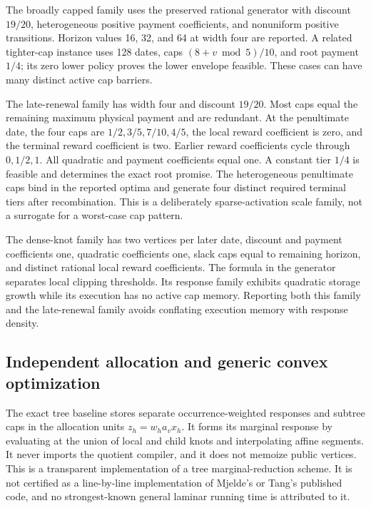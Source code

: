 The broadly capped family uses the preserved rational generator with discount $19/20$, heterogeneous positive payment coefficients, and nonuniform positive transitions. Horizon values 16, 32, and 64 at width four are reported. A related tighter-cap instance uses 128 dates, caps $(8+v\bmod5)/10$, and root payment $1/4$; its zero lower policy proves the lower envelope feasible. These cases can have many distinct active cap barriers.

The late-renewal family has width four and discount $19/20$. Most caps equal the remaining maximum physical payment and are redundant. At the penultimate date, the four caps are $1/2,3/5,7/10,4/5$, the local reward coefficient is zero, and the terminal reward coefficient is two. Earlier reward coefficients cycle through $0,1/2,1$. All quadratic and payment coefficients equal one. A constant tier $1/4$ is feasible and determines the exact root promise. The heterogeneous penultimate caps bind in the reported optima and generate four distinct required terminal tiers after recombination. This is a deliberately sparse-activation scale family, not a surrogate for a worst-case cap pattern.

The dense-knot family has two vertices per later date, discount and payment coefficients one, quadratic coefficients one, slack caps equal to remaining horizon, and distinct rational local reward coefficients. The formula in the generator separates local clipping thresholds. Its response family exhibits quadratic storage growth while its execution has no active cap memory. Reporting both this family and the late-renewal family avoids conflating execution memory with response density.

\subsection{Independent allocation and generic convex optimization}
The exact tree baseline stores separate occurrence-weighted responses and subtree caps in the allocation units $z_h=w_ha_vx_h$. It forms its marginal response by evaluating at the union of local and child knots and interpolating affine segments. It never imports the quotient compiler, and it does not memoize public vertices. This is a transparent implementation of a tree marginal-reduction scheme. It is not certified as a line-by-line implementation of Mjelde's or Tang's published code, and no strongest-known general laminar running time is attributed to it.

